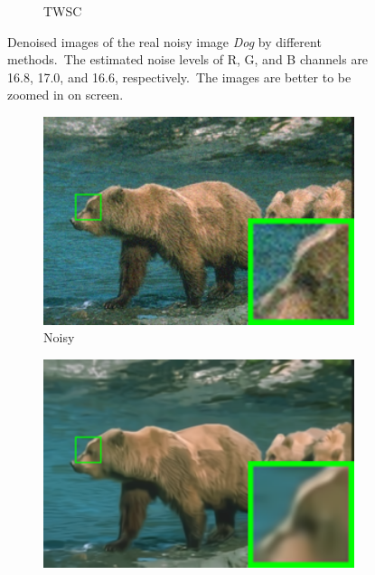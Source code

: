 \begin{figure}
\begin{subfigure}[t]{0.24\textwidth}
		\caption{TWSC}
    \end{subfigure}
    \caption{Denoised images of the real noisy image \textsl{Dog} \cite{ncwebsite} by different methods.\ The estimated noise levels of R, G, and B channels are 16.8, 17.0, and 16.6, respectively.\ The images are better to be zoomed in on screen.}
    \label{fig3}
\end{figure}


\begin{figure}
    \centering
    \begin{subfigure}[t]{0.24\textwidth}
        \centering
        \includegraphics[width=1\textwidth]{images/twsc/nc/resize_br_Noisy_bears.png}
		\caption{Noisy}
    \end{subfigure}
    \hfill
    \begin{subfigure}[t]{0.24\textwidth}
        \centering
        \includegraphics[width=1\textwidth]{images/twsc/nc/resize_br_CBM3D_bears.png}

\end{subfigure}
\end{figure}
